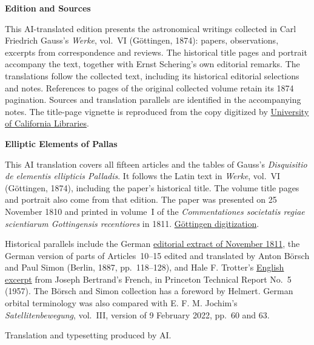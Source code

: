 \thispagestyle{empty}
\begin{center}\textbf{Edition and Sources}\end{center}
\noindent This AI-translated edition presents the astronomical writings collected in Carl Friedrich Gauss’s \textit{Werke}, vol.~VI (Göttingen, 1874): papers, observations, excerpts from correspondence and reviews. The historical title pages and portrait accompany the text, together with Ernst Schering’s own editorial remarks. The translations follow the collected text, including its historical editorial selections and notes. References to pages of the original collected volume retain its 1874 pagination. Sources and translation parallels are identified in the accompanying notes. The title-page vignette is reproduced from the copy digitized by \href{https://archive.org/details/werkecarlf06gausrich/page/n8/mode/1up}{University of California Libraries}.
\par\medskip\noindent\textbf{Elliptic Elements of Pallas}
\par\smallskip
\noindent This AI translation covers all fifteen articles and the tables of Gauss’s \textit{Disquisitio de elementis ellipticis Palladis}. It follows the Latin text in \textit{Werke}, vol.~VI (Göttingen, 1874), including the paper’s historical title. The volume title pages and portrait also come from that edition. The paper was presented on 25 November 1810 and printed in volume~I of the \textit{Commentationes societatis regiae scientiarum Gottingensis recentiores} in 1811. \href{https://gdz.sub.uni-goettingen.de/id/PPN236007467}{Göttingen digitization}.
\par\smallskip\noindent Historical parallels include the German \href{https://www.digitale-sammlungen.de/de/view/bsb10538613?page=463}{editorial extract of November 1811}, the German version of parts of Articles~10--15 edited and translated by Anton Börsch and Paul Simon (Berlin, 1887, pp.~118--128), and Hale F. Trotter’s \href{https://www.york.ac.uk/depts/maths/histstat/gausspallas.htm}{English excerpt} from Joseph Bertrand’s French, in Princeton Technical Report No.~5 (1957). The Börsch and Simon collection has a foreword by Helmert. German orbital terminology was also compared with E. F. M. Jochim’s \textit{Satellitenbewegung}, vol.~III, version of 9 February 2022, pp.~60 and 63.
\par\smallskip\noindent Translation and typesetting produced by AI.
\clearpage
